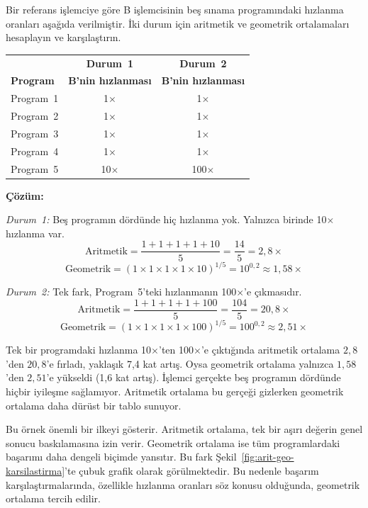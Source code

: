 \begin{ornek}[2.7]
Bir referans işlemciye göre B işlemcisinin beş sınama programındaki hızlanma oranları aşağıda verilmiştir. İki durum için aritmetik ve geometrik ortalamaları hesaplayın ve karşılaştırın.

\begin{center}
\small
\begin{tabular}{lcc}
\toprule
 & \textbf{Durum~1} & \textbf{Durum~2} \\
\textbf{Program} & \textbf{B'nin hızlanması} & \textbf{B'nin hızlanması} \\
\midrule
Program~1 & 1$\times$ & 1$\times$ \\
Program~2 & 1$\times$ & 1$\times$ \\
Program~3 & 1$\times$ & 1$\times$ \\
Program~4 & 1$\times$ & 1$\times$ \\
Program~5 & 10$\times$ & 100$\times$ \\
\bottomrule
\end{tabular}
\end{center}

\textbf{Çözüm:}

\emph{Durum~1:} Beş programın dördünde hiç hızlanma yok. Yalnızca birinde 10$\times$ hızlanma var.
\[
\text{Aritmetik} = \frac{1+1+1+1+10}{5} = \frac{14}{5} = 2{,}8\times
\]
\[
\text{Geometrik} = (1 \times 1 \times 1 \times 1 \times 10)^{1/5} = 10^{0{,}2} \approx 1{,}58\times
\]

\emph{Durum~2:} Tek fark, Program~5'teki hızlanmanın 100$\times$'e çıkmasıdır.
\[
\text{Aritmetik} = \frac{1+1+1+1+100}{5} = \frac{104}{5} = 20{,}8\times
\]
\[
\text{Geometrik} = (1 \times 1 \times 1 \times 1 \times 100)^{1/5} = 100^{0{,}2} \approx 2{,}51\times
\]

Tek bir programdaki hızlanma 10$\times$'ten 100$\times$'e çıktığında aritmetik ortalama $2{,}8$'den $20{,}8$'e fırladı, yaklaşık 7,4 kat artış. Oysa geometrik ortalama yalnızca $1{,}58$'den $2{,}51$'e yükseldi (1,6 kat artış). İşlemci gerçekte beş programın dördünde hiçbir iyileşme sağlamıyor. Aritmetik ortalama bu gerçeği gizlerken geometrik ortalama daha dürüst bir tablo sunuyor.
\end{ornek}

Bu örnek önemli bir ilkeyi gösterir. Aritmetik ortalama, tek bir aşırı değerin genel sonucu baskılamasına izin verir. Geometrik ortalama ise tüm programlardaki başarımı daha dengeli biçimde yansıtır. Bu fark Şekil~\ref{fig:arit-geo-karsilastirma}'te çubuk grafik olarak görülmektedir. Bu nedenle başarım karşılaştırmalarında, özellikle hızlanma oranları söz konusu olduğunda, geometrik ortalama tercih edilir.

